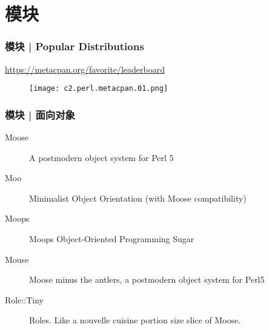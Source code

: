 \section{模块}
\begin{frame}
  \frametitle{模块 | Popular Distributions}
  \begin{center}
    \href{https://metacpan.org/favorite/leaderboard}{https://metacpan.org/favorite/leaderboard}
  \begin{figure}
    \texttt{[image: c2.perl.metacpan.01.png]}
  \end{figure}
\end{center}
\end{frame}

\begin{frame}
  \frametitle{模块 | 面向对象}
    \begin{description}
      \item[Moose] A postmodern object system for Perl 5 
      \item[Moo] Minimalist Object Orientation (with Moose compatibility)
      \item[Moops] Moops Object-Oriented Programming Sugar
      \item[Mouse] Moose minus the antlers, a postmodern object system for Perl5
      \item[Role::Tiny] Roles. Like a nouvelle cuisine portion size slice of Moose.
    \end{description}
\end{frame}

